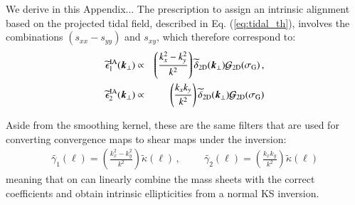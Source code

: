 \JHD{[To reword]} We derive in this Appendix...  
The prescription to assign an intrinsic alignment based on the projected tidal field, described in Eq. (\ref{eq:tidal_th}), involves the combinations $(s_{xx} - s_{yy})$ and $s_{xy}$, which therefore correspond to:
\begin{eqnarray}
 \widetilde{\epsilon}_1^{\rm IA} (\boldsymbol k_{\perp})  &\propto& \left(\frac{k_x^2 - k_y^2}{k^2} \right) \widetilde{\delta}_{\rm 2D}(\boldsymbol k_{\perp})\mathcal{G_{\rm 2D}}(\sigma_{\rm G})  \, ,\nonumber \\
 \widetilde{\epsilon}_2^{\rm IA} (\boldsymbol k_\perp)  &\propto& \left(\frac{k_x k_y}{k^2} \right) \widetilde {\delta}_{\rm 2D}(\boldsymbol k_\perp)\mathcal{G_{\rm 2D}}(\sigma_{\rm G}) 
\end{eqnarray}

Aside from the smoothing kernel, these are the same filters that are used for converting convergence maps to shear maps under the \citet[][KS hereafter]{KaiserSquires} inversion:
 \begin{eqnarray}
 \widetilde{\gamma_1} (\boldsymbol \ell)  = \left(\frac{k_x^2 - k_y^2}{k^2} \right) \widetilde {\kappa}(\boldsymbol \ell) \, , \hspace{1cm} \widetilde{\gamma_2} (\boldsymbol \ell)  = \left(\frac{k_x k_y}{k^2} \right) \widetilde {\kappa}(\boldsymbol \ell)
\end{eqnarray}
meaning that on can linearly combine the mass sheets with the correct coefficients and obtain intrinsic ellipticities from a normal KS inversion. 


